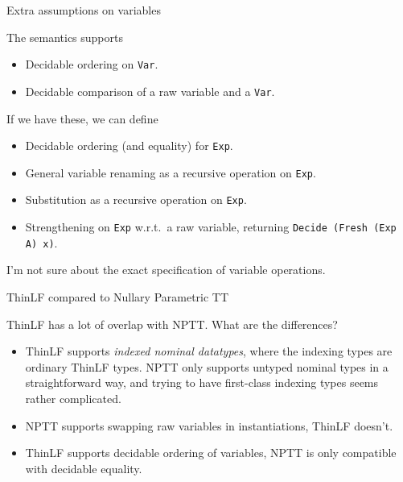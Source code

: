 \documentclass[dvipsnames,aspectratio=169]{beamer}
\newcommand{\vsp}{\vspace{1em}}
\theoremstyle{remark}
\begin{document}
\begin{frame}[fragile]{Extra assumptions on variables}

The semantics supports
\begin{itemize}
  \item Decidable ordering on \texttt{Var}.
  \item Decidable comparison of a raw variable and a \texttt{Var}.
\end{itemize}
\vsp

If we have these, we can define
\begin{itemize}
 \item Decidable ordering (and equality) for \texttt{Exp}.
 \item General variable renaming as a recursive operation on \texttt{Exp}.
 \item Substitution as a recursive operation on \texttt{Exp}.
 \item Strengthening on \texttt{Exp} w.r.t.\ a raw variable, returning
       \texttt{Decide (Fresh (Exp A) x)}.
\end{itemize}
\vsp

I'm not sure about the exact specification of variable operations.

\end{frame}

\begin{frame}[fragile]{ThinLF compared to Nullary Parametric TT}

ThinLF has a lot of overlap with NPTT. What are the
differences?
\vsp

\begin{itemize}
\item ThinLF supports \emph{indexed nominal datatypes}, where the indexing types are ordinary ThinLF
  types. NPTT only supports untyped nominal types in a straightforward way, and trying to have
  first-class indexing types seems rather complicated.
\item NPTT supports swapping raw variables in instantiations, ThinLF doesn't.
\item ThinLF supports decidable ordering of variables, NPTT is only compatible with decidable equality.
\end{itemize}


\end{frame}
\end{document}
